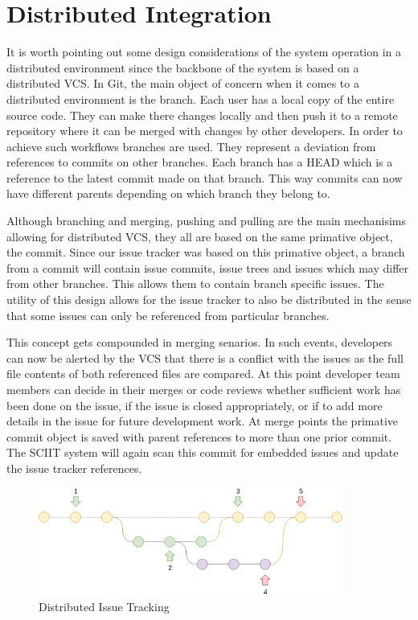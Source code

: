 \documentclass{mproj}
\begin{document}

\section{Distributed Integration}

It is worth pointing out some design considerations of the system operation in a distributed environment since the backbone of the system is based on a distributed VCS. In Git, the main object of concern when it comes to a distributed environment is the branch. Each user has a local copy of the entire source code. They can make there changes locally and then push it to a remote repository where it can be merged with changes by other developers. In order to achieve such workflows branches are used. They represent a deviation from references to commits on other branches. Each branch has a HEAD which is a reference to the latest commit made on that branch. This way commits can now have different parents depending on which branch they belong to.

Although branching and merging, pushing and pulling are the main mechanisims allowing for distributed VCS, they all are based on the same primative object, the commit. Since our issue tracker was based on this primative object, a branch from a commit will contain issue commits, issue trees and issues which may differ from other branches. This allows them to contain branch specific issues. The utility of this design allows for the issue tracker to also be distributed in the sense that some issues can only be referenced from particular branches.

This concept gets compounded in merging senarios. In such events, developers can now be alerted by the VCS that there is a conflict with the issues as the full file contents of both referenced files are compared. At this point developer team members can decide in their merges or code reviews whether sufficient work has been done on the issue, if the issue is closed appropriately, or if to add more details in the issue for future development work. At merge points the primative commit object is saved with parent references to more than one prior commit. The SCIIT system will again scan this commit for embedded issues and update the issue tracker references.

\begin{figure}[t]
\caption{Distributed Issue Tracking}
\label{fig:distributed-issue-tracking}
\centering
\includegraphics[width=10cm]{distributed-issue-tracking}
\end{figure}
\end{document}
